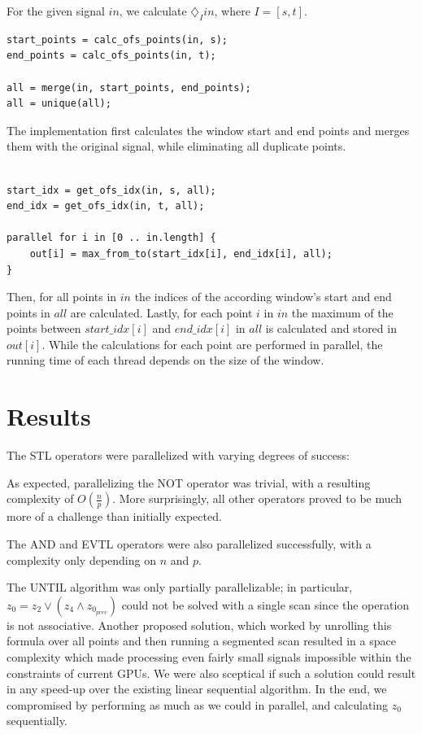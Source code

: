 \documentclass[a4paper,10pt]{article}
\renewcommand{\And}{\wedge}
\newcommand{\Or}{\vee}
\newcommand{\Bevtl}{\diamondsuit_I}
\begin{document}
For the given signal $in$, we calculate $\Bevtl in$, where $I = [s,t]$.

\begin{lstlisting}
start_points = calc_ofs_points(in, s);
end_points = calc_ofs_points(in, t);

all = merge(in, start_points, end_points);
all = unique(all);
\end{lstlisting}

The implementation first calculates the window start and end points and merges them
with the original signal, while eliminating all duplicate points.

\begin{lstlisting}

start_idx = get_ofs_idx(in, s, all);
end_idx = get_ofs_idx(in, t, all);

parallel for i in [0 .. in.length] {
    out[i] = max_from_to(start_idx[i], end_idx[i], all);
}

\end{lstlisting}

Then, for all points in $in$ the indices of the according window's start and end
points in $all$ are calculated. Lastly, for each point $i$ in $in$ the maximum of the
points between $start\_idx[i]$ and $end\_idx[i]$ in $all$ is calculated and stored in
$out[i]$. While the calculations for each point are performed in parallel, the
running time of each thread depends on the size of the window.


\section{Results}

The STL operators were parallelized with varying degrees of success:

As expected, parallelizing the NOT operator was trivial, with a resulting complexity of $O(\frac{n}{p})$. More surprisingly, all other
operators proved to be much more of a challenge than initially expected.

The AND and EVTL operators were also parallelized successfully, with a complexity only depending on $n$ and $p$.

The UNTIL algorithm was only partially parallelizable; in particular,
$z_0 = z_2 \Or (z_4 \And z_{0_{prev}})$ could not be solved with a single scan since
the operation is not associative. Another proposed solution, which worked by unrolling this formula over all points
and then running a segmented scan resulted in a space complexity which made processing even fairly small signals impossible within the constraints of current GPUs. We were also sceptical if such a solution could result in any speed-up over
the existing linear sequential algorithm. In the end, we compromised by performing
as much as we could in parallel, and calculating $z_0$ sequentially.
\end{document}
